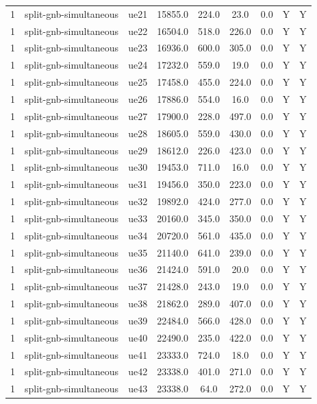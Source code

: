 \begin{table}[ht]
\begin{tabular}{|c|c|c|c|c|c|c|c|c|}
1 & split-gnb-simultaneous & ue21 & 15855.0 & 224.0 & 23.0 & 0.0 & Y & Y \\
1 & split-gnb-simultaneous & ue22 & 16504.0 & 518.0 & 226.0 & 0.0 & Y & Y \\
1 & split-gnb-simultaneous & ue23 & 16936.0 & 600.0 & 305.0 & 0.0 & Y & Y \\
1 & split-gnb-simultaneous & ue24 & 17232.0 & 559.0 & 19.0 & 0.0 & Y & Y \\
1 & split-gnb-simultaneous & ue25 & 17458.0 & 455.0 & 224.0 & 0.0 & Y & Y \\
1 & split-gnb-simultaneous & ue26 & 17886.0 & 554.0 & 16.0 & 0.0 & Y & Y \\
1 & split-gnb-simultaneous & ue27 & 17900.0 & 228.0 & 497.0 & 0.0 & Y & Y \\
1 & split-gnb-simultaneous & ue28 & 18605.0 & 559.0 & 430.0 & 0.0 & Y & Y \\
1 & split-gnb-simultaneous & ue29 & 18612.0 & 226.0 & 423.0 & 0.0 & Y & Y \\
1 & split-gnb-simultaneous & ue30 & 19453.0 & 711.0 & 16.0 & 0.0 & Y & Y \\
1 & split-gnb-simultaneous & ue31 & 19456.0 & 350.0 & 223.0 & 0.0 & Y & Y \\
1 & split-gnb-simultaneous & ue32 & 19892.0 & 424.0 & 277.0 & 0.0 & Y & Y \\
1 & split-gnb-simultaneous & ue33 & 20160.0 & 345.0 & 350.0 & 0.0 & Y & Y \\
1 & split-gnb-simultaneous & ue34 & 20720.0 & 561.0 & 435.0 & 0.0 & Y & Y \\
1 & split-gnb-simultaneous & ue35 & 21140.0 & 641.0 & 239.0 & 0.0 & Y & Y \\
1 & split-gnb-simultaneous & ue36 & 21424.0 & 591.0 & 20.0 & 0.0 & Y & Y \\
1 & split-gnb-simultaneous & ue37 & 21428.0 & 243.0 & 19.0 & 0.0 & Y & Y \\
1 & split-gnb-simultaneous & ue38 & 21862.0 & 289.0 & 407.0 & 0.0 & Y & Y \\
1 & split-gnb-simultaneous & ue39 & 22484.0 & 566.0 & 428.0 & 0.0 & Y & Y \\
1 & split-gnb-simultaneous & ue40 & 22490.0 & 235.0 & 422.0 & 0.0 & Y & Y \\
1 & split-gnb-simultaneous & ue41 & 23333.0 & 724.0 & 18.0 & 0.0 & Y & Y \\
1 & split-gnb-simultaneous & ue42 & 23338.0 & 401.0 & 271.0 & 0.0 & Y & Y \\
1 & split-gnb-simultaneous & ue43 & 23338.0 & 64.0 & 272.0 & 0.0 & Y & Y \\

\end{tabular}
\end{table}
